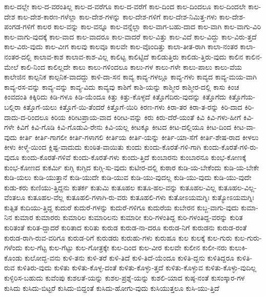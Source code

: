 {ಕಾಲ-ದಲ್ಲೇ
ಕಾಲ-ದ-ವರಂತಿಲ್ಲ
ಕಾಲ-ದ-ವರೆಗೂ
ಕಾಲ-ದ-ವರೆಗೆ
ಕಾಲ-ದಿಂದ
ಕಾಲ-ದಿಂದಲೂ
ಕಾಲ-ದಿಂದಲೇ
ಕಾಲ-ದೇಶ
ಕಾಲ-ದೇಶ-ಕಾರಣ-ಗಳೆಲ್ಲಾ
ಕಾಲ-ದೇಶ-ಗಳನ್ನು
ಕಾಲ-ದೇಶ-ಗಳಿಗೆ
ಕಾಲ-ದೇಶ-ನಿಮಿತ್ತ-ಗಳು
ಕಾಲ-ದೇಶ-ಪಂಗಡ-ಗಳಿಗೆ
ಕಾಲರ
ಕಾಲ-ವನ್ನು
ಕಾಲ-ವನ್ನೂ
ಕಾಲ-ವನ್ನೆಲ್ಲಾ
ಕಾಲ-ವಾಗ-ಬಹು-ದಾದ
ಕಾಲ-ವಾಗಿ
ಕಾಲ-ವಾಗು-ವಿರಿ
ಕಾಲ-ವಾಗು-ವುದಕ್ಕೆ
ಕಾಲ-ವಾದ
ಕಾಲ-ವಾದರೂ
ಕಾಲ-ವಾದರೆ
ಕಾಲ-ವಿತ್ತು
ಕಾಲ-ವಿದೆ
ಕಾಲ-ವಿದ್ದು
ಕಾಲ-ವಿರು-ತ್ತದೆ
ಕಾಲ-ವಿರು-ವುದು
ಕಾಲ-ವೀಗ
ಕಾಲವು
ಕಾಲವೂ
ಕಾಲವೇ
ಕಾಲ-ವೊಂದಿತ್ತು
ಕಾಲಾ-ತೀತ-ರಾಗಿ
ಕಾಲಾ-ನಂತರ
ಕಾಲಾ-ನಂತರ-ದಲ್ಲಿ
ಕಾಲಾವ-ಕಾಶ
ಕಾಲಾವ-ಕಾಶ-ವಿಲ್ಲ
ಕಾಲಿಟ್ಟ
ಕಾಲಿಟ್ಟಿದೆ
ಕಾಲಿಡುತ್ತಿರು
ಕಾಲಿಡು-ತ್ತಿರು-ವುದು
ಕಾಲಿನ
ಕಾಲಿನ-ಮೇಲೆ
ಕಾಲಿ-ನಿಂದ
ಕಾಲಿಲ್ಲದೇ
ಕಾಲು
ಕಾಲು-ಗಳಿಂದಲೂ
ಕಾಲು-ಗಳ
ಕಾಲು-ಗಳೇ
ಕಾಲು-ಪಾಲು
ಕಾಲು-ವೆಯ
ಕಾಲೇಜಿನ
ಕಾಲ್ಪನಿಕ
ಕಾಲ್ಪನಿಕ-ವಾದದ್ದು
ಕಾಳಿ-ದಾ-ಸನ
ಕಾವ್ಯ
ಕಾವ್ಯ-ಗಳಲ್ಲೂ
ಕಾವ್ಯ-ಗಳು
ಕಾವ್ಯದ
ಕಾವ್ಯ-ಮಯ-ವಾಗಿ
ಕಾವ್ಯ-ರಸ-ವನ್ನು
ಕಾವ್ಯ-ವನ್ನು
ಕಾವ್ಯ-ವಿದು
ಕಾವ್ಯವು
ಕಾಶಿಗೆ
ಕಾಶಿ-ಯನ್ನು
ಕಾಶ್ಮೀರ
ಕಾಶ್ಮೀರ-ದಲ್ಲಿ
ಕಾಸು
ಕಿಂಚ
ಕಿಂವದಂತಿ
ಕಿಕ್ಕಿರಿದು
ಕಿಡಿ-ಗಳೂ
ಕಿಡಿ-ಯೆಂದೂ
ಕಿತ್ತು
ಕಿತ್ತು-ಕೊಳ್ಳದೆ
ಕಿತ್ತೊಗೆದಿರು-ವುದನ್ನು
ಕಿತ್ತೊಗೆದು
ಕಿತ್ತೊಗೆಯ-ಬಲ್ಲಿರಾ
ಕಿತ್ತೊಗೆ-ಯಲು
ಕಿತ್ತೊಗೆ-ಯಿ-ತೆಂದರೆ
ಕಿತ್ತೊಗೆ-ಯಿರಿ
ಕಿರಣ-ಗಳು
ಕಿರಾ-ತರ
ಕಿರಾ-ತ-ರನ್ನು
ಕಿರಿ-ದಾದ
ಕಿರಿ-ದಾದು-ದ-ರಿಂದಲೂ
ಕಿರಿಯ
ಕಿರೀಟಪ್ರಾಯ-ವಾದ
ಕಿರೀಟ-ವನ್ನು
ಕಿರು
ಕಿರು-ದೆರೆ-ಯಂತೆ
ಕಿವಿ
ಕಿವಿ-ಗಳು-ಹೀಗೆ
ಕಿವಿ-ಗಳೇ
ಕಿವಿಗೆ
ಕಿವಿ-ಗೊಡಿ
ಕಿವಿ-ಗೊಡುವಿ-ರೇನು
ಕಿವಿ-ಯಲ್ಲ
ಕೀಟಕ್ಕೂ
ಕೀಟದ
ಕೀಟ-ದಲ್ಲಿಯೂ
ಕೀಟ-ದಿಂದ
ಕೀಟ-ವಾ-ವುದು
ಕೀರ್ತಿ
ಕೀರ್ತಿ-ಗಾಗಲೀ
ಕೀರ್ತಿ-ಗಳಾಗಲಿ
ಕೀರ್ತಿಯ
ಕೀರ್ತಿ-ಯನ್ನು
ಕೀರ್ತಿ-ಯಾ-ಸೆಗೆ
ಕೀರ್ತಿ-ಶೇಷ-ರಾದ
ಕೀಳಲು
ಕೀಳು
ಕೀಳ್ಮೆ-ಯಿಂದ
ಕ್ಲಿಷ್ಟ-ವಾದುದು
ಕುಂಠಿತ-ವಾಯಿತು
ಕುಂದು
ಕುಂದು-ಕೊರತೆ-ಗಳಿ-ಗಾಗಿ
ಕುಂದು-ಕೊರತೆ-ಗಳಿ-ರು-ವುದೂ
ಕುಂದು-ಕೊರತೆ-ಗಳಿವೆ
ಕುಂದು-ಕೊರತೆ-ಗಳು
ಕುಂದು-ತ್ತಿದೆ
ಕುಂಬಾರನು
ಕುಂಬಾರನೂ
ಕುಂಭ-ಕೋಣಕ್ಕೆ
ಕುಂಭ-ಕೋಣದ
ಕುಕರ್ಮಿ
ಕುಗ್ಗಿ
ಕುಗ್ಗಿದ
ಕುಗ್ಗಿ-ಸು-ವುದು
ಕುಟೀರ-ದಲ್ಲಿ
ಕುಠಾರ
ಕುಡಿ-ಯ-ಬೇಕೆಂದು
ಕುಡಿ-ಯ-ಬೇಕೇ
ಕುಡಿ-ಯಲು
ಕುಡಿ-ಯುತ್ತಾನೆ
ಕುಡಿ-ಯುದೇ
ಕುಡಿ-ಯುವ
ಕುಡಿ-ಯು-ವುದಲ್ಲ
ಕುಡಿ-ಯು-ವುದು
ಕುಡಿ-ಯು-ವುದೇ
ಕುಡು-ಕರು
ಕುಣಿಯು-ತ್ತಿದ್ದನು
ಕುತರ್ಕ
ಕುತುಮಿ
ಕುತೂಹಲ
ಕುತೂ-ಹಲ-ವನ್ನು
ಕುತೂಹಲ-ವಿಲ್ಲ
ಕುತೂಹಲ-ವಿಲ್ಲ-ವೆಂತಲೂ
ಕುತೂಹಲ-ವೆಲ್ಲ
ಕುತೂಹಲಿ-ಗಳಾಗಿ-ರು-ವರು
ಕುತೂಹಲಿ-ಗಳು
ಕುತೋಽಯಮಗ್ನಿಃ
ಕುತ್ಯೋಽಯಮಗ್ನಿಃ
ಕುತ್ಸಿತ
ಕುದಿಯು-ತ್ತಿದ್ದ
ಕುದುರೆ
ಕುದುರೆ-ಗಳನ್ನು
ಕುದುರೆ-ಗಳಿಗೂ
ಕುದುರೆಯ
ಕುಬೇರನ
ಕುಬ್ಜ-ವಾಗು-ವುದು
ಕುಮಾ-ನಿನ
ಕುಮಾರ
ಕುಮಾರರು
ಕುಮಾರಿಲ
ಕುಮಾರಿಲನು
ಕುಮಾರೀ
ಕುರಿ-ಗಳಂತಿದ್ದ
ಕುರಿ-ಗಳಂತಿದ್ದ-ವರನ್ನು
ಕುರಿತ
ಕುರಿತಂತೆ
ಕುರಿತ-ದ್ದಾದರೆ
ಕುರಿತಾದ
ಕುರಿತು
ಕುರುಡ
ಕುರುಡ-ನಾ-ದರೂ
ಕುರುಡ-ನಿಗೆ
ಕುರುಡನು
ಕುರುಡ-ರಂತೆ
ಕುರುಡ-ರಾಗಿ-ರುವ-ವರಿಗೂ
ಕುರುಡ-ರಿಗೆ
ಕುರುಡರು
ಕುರುಹು-ಗಳು
ಕುರುಹೂ
ಕುಲ
ಕುಲಕ್ಕೆ
ಕುಲ-ಗುರು
ಕುಲ-ಗುರು-ಗಳೆಂದು
ಕುಲ-ಗೆಟ್ಟ
ಕುಲ-ಗೆಟ್ಟು
ಕುಲ-ಗೋತ್ರಕ್ಕೇ
ಕುಲ-ದಿಂದ
ಕುಲ-ವೀರ
ಕುಲವೇ
ಕುಲೀನ
ಕುಲೀ-ನರು
ಕುಲುಕಿ-ಕೊಂಡು
ಕುಲೋದ್ಭ-ವನು
ಕುಳಿ-ತನು
ಕುಳಿ-ತರೆ
ಕುಳಿ-ತಿದೆ
ಕುಳಿ-ತಿದೆ-ಯೆಂದೂ
ಕುಳಿತಿ-ದ್ದನು
ಕುಳಿತಿದ್ದರೂ
ಕುಳಿತಿ-ರುವ
ಕುಳಿತಿರು-ವುದು
ಕುಳಿತು
ಕುಳಿತು-ಕೊಳ್ಳ-ದಂತೆ
ಕುಳಿತು-ಕೊಳ್ಳು-ತ್ತದೆ
ಕುಳಿತು-ಕೊಳ್ಳುವ
ಕುಳಿತು-ಕೊಳ್ಳು-ವುದಿಲ್ಲ
ಕುಳ್ಳಿರಿಸ-ಬಹುದು
ಕುವೆಂಪು
ಕುಶಲತೆ-ಯನ್ನು
ಕುಶಲ-ಪ್ರಶ್ನೆ-ಯನ್ನು
ಕುಶಲಿ-ಯಾದ
ಕುಷ್ಠ-ನಂತೆ
ಕುಸಂಸ್ಕಾರ-ಗಳ
ಕುಸಿದು
ಕುಸಿದು-ಬಿಟ್ಟರೆ
ಕುಸಿದು-ಬಿದ್ದಂತೆ
ಕುಸಿದು-ಹೋಗು-ವುದು
ಕುಸಿಯುತ್ತಲೂ
ಕುಸಿ-ಯು-ತ್ತಿದೆ
}
